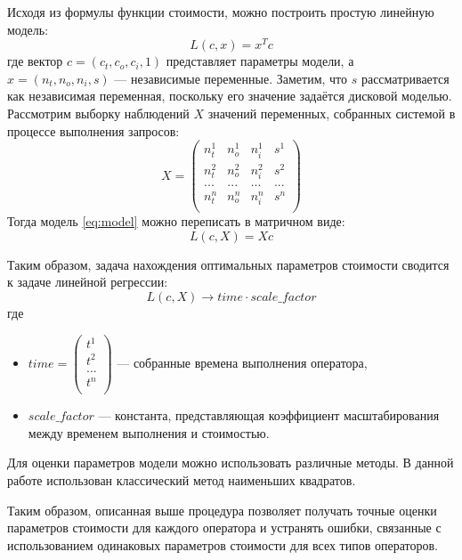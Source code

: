 Исходя из формулы функции стоимости, можно построить простую линейную модель:
\begin{equation}
    L(c,x) = x^T c
    \label{eq:model}
\end{equation}
где вектор \(c=(c_t, c_o, c_i, 1)\) представляет параметры модели, а \(x=(n_t, n_o, n_i, s)\) — независимые переменные. Заметим, что \(s\) рассматривается как независимая переменная, поскольку его значение задаётся дисковой моделью.
Рассмотрим выборку наблюдений \(X\) значений переменных, собранных системой в
процессе выполнения запросов:
\begin{equation}
    X=
    \begin{pmatrix}
        n_t^1 & n_o^1 & n_i^1 & s^1\\
        n_t^2 & n_o^2 & n_i^2 & s^2\\
        ... & ... & ... & ... \\
        n_t^n & n_o^n & n_i^n & s^n\\
    \end{pmatrix}
\end{equation}
Тогда модель \ref{eq:model} можно переписать в матричном виде:
\begin{equation}
    L(c,X) = Xc
    \label{eq:model_matrix}
\end{equation}

Таким образом, задача нахождения оптимальных параметров стоимости сводится к
задаче линейной регрессии:
\begin{equation}
    L(c,X) \rightarrow time \cdot scale\_factor
\end{equation}
где
\begin{itemize}
    \item
    \(time=
    \begin{pmatrix}
        t^1\\
        t^2\\
        ...\\
        t^n\\
    \end{pmatrix}
    \) — собранные времена выполнения оператора,
    \item \(scale\_factor\) — константа, представляющая коэффициент масштабирования
    между временем выполнения и стоимостью.
\end{itemize}
Для оценки параметров модели можно использовать различные методы. В данной работе
использован классический метод наименьших квадратов.

Таким образом, описанная выше процедура позволяет получать точные оценки
параметров стоимости для каждого оператора и устранять ошибки, связанные с
использованием одинаковых параметров стоимости для всех типов операторов.


